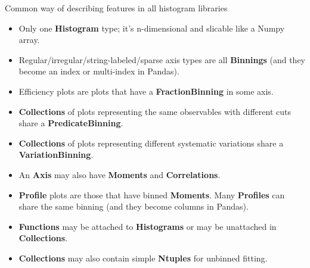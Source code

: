 \documentclass[aspectratio=169]{beamer}
\begin{document}
\begin{frame}{Common way of describing features in all histogram libraries}
\vspace{0.5 cm}
\begin{itemize}
\item Only one {\bf Histogram} type; it's n-dimensional and slicable like a Numpy array.
\item Regular/irregular/string-labeled/sparse axis types are all {\bf Binnings} (and they become an index or multi-index in Pandas).
\item Efficiency plots are plots that have a {\bf FractionBinning} in some axis.
\item {\bf Collections} of plots representing the same observables with different cuts share a {\bf PredicateBinning}.
\item {\bf Collections} of plots representing different systematic variations share a {\bf VariationBinning}.
\item An {\bf Axis} may also have {\bf Moments} and {\bf Correlations}.
\item {\bf Profile} plots are those that have binned {\bf Moments}. Many {\bf Profiles} can share the same binning (and they become columns in Pandas).
\item {\bf Functions} may be attached to {\bf Histograms} or may be unattached in {\bf Collections}.
\item {\bf Collections} may also contain simple {\bf Ntuples} for unbinned fitting.
\end{itemize}
\end{frame}
\end{document}
